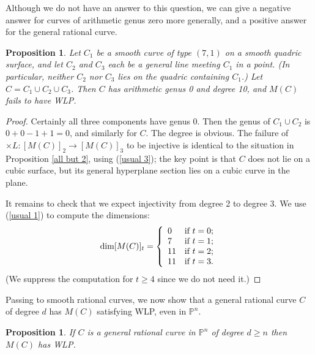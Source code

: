 \documentclass[12pt]{amsart}%
\numberwithin{equation}{section}
\newtheorem{proposition}[theorem]{Proposition}
\theoremstyle{definition}
\numberwithin{equation}{section}
\newcommand{\PP}{ \ensuremath{\mathbb{P}}}
\begin{document}
Although we do not have an answer to this question, we can give a negative answer for curves of arithmetic genus zero more generally, and a positive answer for the general rational curve.

\begin{proposition} \label{arithgen0}
    Let $C_1$ be a smooth curve of type $(7,1)$ on a smooth quadric surface, and let $C_2$ and $C_3$ each be a general line meeting $C_1$ in a point. (In particular, neither $C_2$ nor $C_3$ lies on the quadric containing $C_1$.) Let $C = C_1 \cup C_2 \cup C_3$. Then $C$ has arithmetic genus 0 and degree 10, and $M(C)$ fails to have WLP.
\end{proposition}

\begin{proof}
    Certainly all three components have genus 0. Then the genus of $C_1 \cup C_2$ is $0 + 0 -1 + 1 = 0$, and similarly for $C$. The degree is obvious. The failure of $\times L \colon [M(C)]_2 \rightarrow [M(C)]_3$ to be injective is identical to the situation in Proposition \ref{all but 2}, using (\ref{usual 3}); the key point is that $C$ does not lie on a cubic surface, but its general hyperplane section lies on a cubic curve in the plane.
    
    It remains to check that we expect injectivity from degree 2 to degree 3. We use (\ref{usual 1}) to compute the dimensions:
    \[
\dim [M(C)]_t = \left \{
\begin{array}{ll}
0 & \hbox{if } t=0; \\
7 & \hbox{if } t=1; \\
11 & \hbox{if } t=2; \\
11 & \hbox{if } t=3.
\end{array}
\right.
    \]
    (We suppress the computation for $t \geq 4$ since we do not need it.)
\end{proof}

Passing to smooth rational curves, we now show that a general rational curve $C$ of degree $d$ has $M(C)$ satisfying WLP, even in $\PP^n$.

\begin{proposition}\label{prop:rational curve}
    If $C$ is a general rational curve in $\PP^n$ of degree $d \geq n$ then $M(C)$ has WLP.
\end{proposition}
\end{document}
